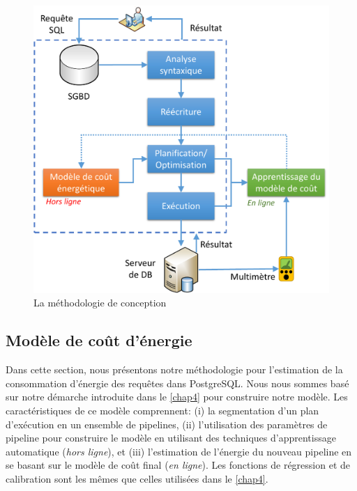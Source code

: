 \begin{figure}
	\centering
	\includegraphics[scale=0.55]{chapitre5/chap5Fig/dbms-flow.pdf}
	\caption{La méthodologie de conception}
	\label{fig:methodo-postgres}
\end{figure}

\subsection{Modèle de coût d'énergie}
Dans cette section, nous présentons notre méthodologie pour l'estimation de la consommation d'énergie des requêtes dans PostgreSQL. Nous nous sommes basé sur notre démarche introduite dans le \ref{chap4} pour construire notre modèle. Les caractéristiques de ce modèle comprennent: (i) la segmentation d'un plan d'exécution en un ensemble de pipelines, (ii) l'utilisation des paramètres de pipeline pour construire le modèle en utilisant des techniques d'apprentissage automatique (\textit{hors ligne}), et (iii) l'estimation de l'énergie du nouveau pipeline en se basant sur le modèle de coût final (\textit{en ligne}). Les fonctions de régression et de calibration sont les mêmes que celles utilisées dans le \ref{chap4}.

